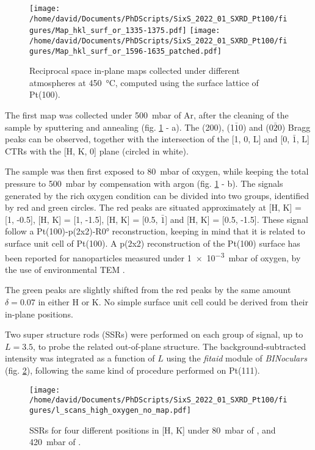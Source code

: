 \begin{figure}[!htb]
    \centering
    \texttt{[image: /home/david/Documents/PhDScripts/SixS\_2022\_01\_SXRD\_Pt100/figures/Map\_hkl\_surf\_or\_1335-1375.pdf]}
    \texttt{[image: /home/david/Documents/PhDScripts/SixS\_2022\_01\_SXRD\_Pt100/figures/Map\_hkl\_surf\_or\_1596-1635\_patched.pdf]}
    \caption{
        Reciprocal space in-plane maps collected under different atmospheres at \qty{450}{\degreeCelsius}, computed using the surface lattice of Pt(100).
    }
    \label{fig:MapsPt100A}
\end{figure}

The first map was collected under \qty{500}{\milli\bar} of Ar, after the cleaning of the sample by sputtering and annealing (fig. \ref{fig:MapsPt100A} - a).
The (200), (1$\bar{1}$0) and (0$\bar{2}$0) Bragg peaks can be observed, together with the intersection of the [1, 0, L] and [0, $\bar{1}$, L] CTRs with the [H, K, 0] plane (circled in white).

The sample was then first exposed to \qty{80}{\milli\bar} of oxygen, while keeping the total pressure to \qty{500}{\milli\bar} by compensation with argon (fig. \ref{fig:MapsPt100A} - b).
The signals generated by the rich oxygen condition can be divided into two groups, identified by red and green circles.
The red peaks are situated approximately at [H, K] = [1, -0.5], [H, K] = [1, -1.5], [H, K] = [0.5, $\bar{1}$] and [H, K] = [0.5, -1.5].
These signal follow a Pt(100)-p(2x2)-R\ang{0} reconstruction, keeping in mind that it is related to surface unit cell of Pt(100).
A p(2x2) reconstruction of the Pt(100) surface has been reported for nanoparticles measured under \qty{1e-3}{\milli\bar} of oxygen, by the use of environmental TEM \parencite{Li2016}.

The green peaks are slightly shifted from the red peaks by the same amount $\delta = 0.07$ in either H or K.
No simple surface unit cell could be derived from their in-plane positions.

Two super structure rods (SSRs) were performed on each group of signal, up to $L=3.5$, to probe the related out-of-plane structure.
The background-subtracted intensity was integrated as a function of $L$ using the \textit{fitaid} module of \textit{BINoculars} (fig. \ref{fig:LScansHighOxygenPt100}), following the same kind of procedure performed on Pt(111).

\begin{figure}[!htb]
    \centering
    \texttt{[image: /home/david/Documents/PhDScripts/SixS\_2022\_01\_SXRD\_Pt100/figures/l\_scans\_high\_oxygen\_no\_map.pdf]}
    \caption{
        SSRs for four different positions in [H, K] under \qty{80}{\milli\bar} of , and \qty{420}{\milli\bar} of .
    }
    \label{fig:LScansHighOxygenPt100}
\end{figure}


